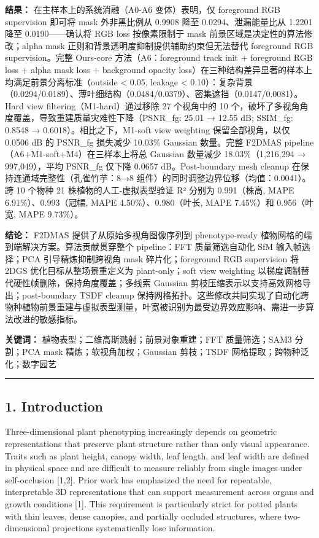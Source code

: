 \documentclass[11pt,a4paper]{article}
\begin{document}
\textbf{结果：} 在主样本上的系统消融（A0-A6 变体）表明，仅 foreground
RGB supervision 即可将 mask 外非黑比例从 0.9908 降至
0.0294、泄漏能量比从 1.2201 降至 0.0190------确认将 RGB loss
按像素限制于 mask 前景区域是决定性的算法修改；alpha mask
正则和背景透明度抑制提供辅助约束但无法替代 foreground RGB
supervision。完整 Ours-core 方法（A6：foreground track init + foreground
RGB loss + alpha mask loss + background opacity
loss）在三种结构差异显著的样本上均满足前景分离标准（outside \textless{}
0.05, leakage \textless{}
0.10）：复杂背景（0.0294/0.0189）、薄叶细结构（0.0484/0.0379）、密集遮挡（0.0147/0.0081）。Hard
view filtering（M1-hard）通过移除 27 个视角中的 10
个，破坏了多视角角度覆盖，导致重建质量灾难性下降（PSNR\_fg: 25.01 →
12.55 dB; SSIM\_fg: 0.8548 → 0.6018）。相比之下，M1-soft view weighting
保留全部视角，以仅 0.0506 dB 的 PSNR\_fg 损失减少 10.03\% Gaussian
数量。完整 F2DMAS pipeline（A6+M1-soft+M4）在三样本上将总 Gaussian
数量减少 18.03\%（1,216,294 → 997,049），平均 PSNR\_fg 仅下降 0.0657
dB。Post-boundary mesh cleanup 在保持连通域完整性（孔雀竹芋：8→8
组件）的同时调整边界位移（均值：0.0041）。跨 10 个物种 21
株植物的人工-虚拟表型验证 R² 分别为 0.991（株高, MAPE
6.91\%）、0.993（冠幅, MAPE 4.50\%）、0.980（叶长, MAPE 7.45\%）和
0.956（叶宽, MAPE 9.73\%）。

\textbf{结论：} F2DMAS 提供了从原始多视角图像序列到 phenotype-ready
植物网格的端到端解决方案。算法贡献贯穿整个 pipeline：FFT 质量筛选自动化
SfM 输入帧选择；PCA 引导精炼抑制跨视角 mask 碎片化；foreground RGB
supervision 将 2DGS 优化目标从整场景重定义为 plant-only；soft view
weighting 以梯度调制替代硬性帧删除，保持角度覆盖；多线索 Gaussian
剪枝压缩表示以支持高效网格导出；post-boundary TSDF cleanup
保持网格拓扑。这些修改共同实现了自动化跨物种植物前景重建与虚拟表型测量，叶宽被识别为最受边界效应影响、需进一步算法改进的敏感指标。

\textbf{关键词：} 植物表型；二维高斯溅射；前景对象重建；FFT
质量筛选；SAM3 分割；PCA mask 精炼；软视角加权；Gaussian 剪枝；TSDF
网格提取；跨物种泛化；数字园艺

\begin{center}\rule{0.5\linewidth}{0.5pt}\end{center}

\subsection{1. Introduction}\label{introduction}

Three-dimensional plant phenotyping increasingly depends on geometric
representations that preserve plant structure rather than only visual
appearance. Traits such as plant height, canopy width, leaf length, and
leaf width are defined in physical space and are difficult to measure
reliably from single images under self-occlusion {[}1,2{]}. Prior work
has emphasized the need for repeatable, interpretable 3D representations
that can support measurement across organs and growth conditions
{[}1{]}. This requirement is particularly strict for potted plants with
thin leaves, dense canopies, and partially occluded structures, where
two-dimensional projections systematically lose information.
\end{document}
